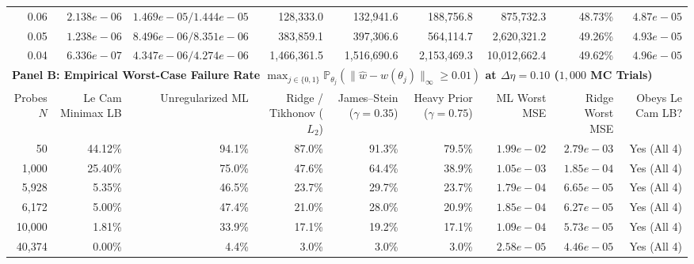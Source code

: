 \begin{table}[htbp]
{\begin{tabular}{rrrrrrrrr}
0.06 & $2.138e-06$ & $1.469e-05 / 1.444e-05$ & 128,333.0 & 132,941.6 & 188,756.8 & 875,732.3 & 48.73\% & $4.87e-05$ \\
0.05 & $1.238e-06$ & $8.496e-06 / 8.351e-06$ & 383,859.1 & 397,306.6 & 564,114.7 & 2,620,321.2 & 49.26\% & $4.93e-05$ \\
0.04 & $6.336e-07$ & $4.347e-06 / 4.274e-06$ & 1,466,361.5 & 1,516,690.6 & 2,153,469.3 & 10,012,662.4 & 49.62\% & $4.96e-05$ \\
\midrule
\multicolumn{9}{l}{\textbf{Panel B: Empirical Worst-Case Failure Rate $\max_{j\in\{0,1\}}\mathbb{P}_{\theta_j}(\|\hat{w}-w(\theta_j)\|_\infty \ge 0.01)$ at $\Delta\eta = 0.10$ ($1{,}000$ MC Trials)}} \\
\midrule
Probes $N$ & Le Cam Minimax LB & Unregularized ML & Ridge / Tikhonov ($L_2$) & James--Stein ($\gamma=0.35$) & Heavy Prior ($\gamma=0.75$) & ML Worst MSE & Ridge Worst MSE & Obeys Le Cam LB? \\
\midrule
50 & 44.12\% & 94.1\% & 87.0\% & 91.3\% & 79.5\% & $1.99e-02$ & $2.79e-03$ & Yes (All 4) \\
1,000 & 25.40\% & 75.0\% & 47.6\% & 64.4\% & 38.9\% & $1.05e-03$ & $1.85e-04$ & Yes (All 4) \\
5,928 & 5.35\% & 46.5\% & 23.7\% & 29.7\% & 23.7\% & $1.79e-04$ & $6.65e-05$ & Yes (All 4) \\
6,172 & 5.00\% & 47.4\% & 21.0\% & 28.0\% & 20.9\% & $1.85e-04$ & $6.27e-05$ & Yes (All 4) \\
10,000 & 1.81\% & 33.9\% & 17.1\% & 19.2\% & 17.1\% & $1.09e-04$ & $5.73e-05$ & Yes (All 4) \\
40,374 & 0.00\% & 4.4\% & 3.0\% & 3.0\% & 3.0\% & $2.58e-05$ & $4.46e-05$ & Yes (All 4) \\
\bottomrule
\end{tabular}%
}
\end{table}
